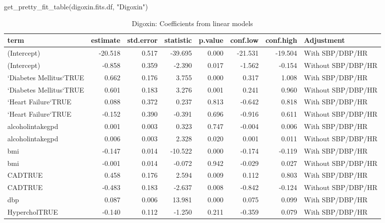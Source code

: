\documentclass[
]{article}
\newenvironment{Shaded}{\begin{snugshade}}{\end{snugshade}}
\newcommand{\FunctionTok}[1]{\textcolor[rgb]{0.00,0.00,0.00}{#1}}
\newcommand{\NormalTok}[1]{#1}
\newcommand{\StringTok}[1]{\textcolor[rgb]{0.31,0.60,0.02}{#1}}
\begin{document}
\begin{Shaded}
\begin{Highlighting}[]
\FunctionTok{get\_pretty\_fit\_table}\NormalTok{(digoxin.fits.df, }\StringTok{"Digoxin"}\NormalTok{)}
\end{Highlighting}
\end{Shaded}

\begin{table}

\caption{\label{tab:digoxin-fit-table}Digoxin: Coefficients from linear models}
\centering
\begin{tabular}[t]{l|r|r|r|r|r|r|l}
\hline
term & estimate & std.error & statistic & p.value & conf.low & conf.high & Adjustment\\
\hline
(Intercept) & -20.518 & 0.517 & -39.695 & 0.000 & -21.531 & -19.504 & With SBP/DBP/HR\\
\hline
(Intercept) & -0.858 & 0.359 & -2.390 & 0.017 & -1.562 & -0.154 & Without SBP/DBP/HR\\
\hline
`Diabetes Mellitus`TRUE & 0.662 & 0.176 & 3.755 & 0.000 & 0.317 & 1.008 & With SBP/DBP/HR\\
\hline
`Diabetes Mellitus`TRUE & 0.601 & 0.183 & 3.276 & 0.001 & 0.241 & 0.960 & Without SBP/DBP/HR\\
\hline
`Heart Failure`TRUE & 0.088 & 0.372 & 0.237 & 0.813 & -0.642 & 0.818 & With SBP/DBP/HR\\
\hline
`Heart Failure`TRUE & -0.152 & 0.390 & -0.391 & 0.696 & -0.916 & 0.611 & Without SBP/DBP/HR\\
\hline
alcoholintakegpd & 0.001 & 0.003 & 0.323 & 0.747 & -0.004 & 0.006 & With SBP/DBP/HR\\
\hline
alcoholintakegpd & 0.006 & 0.003 & 2.328 & 0.020 & 0.001 & 0.011 & Without SBP/DBP/HR\\
\hline
bmi & -0.147 & 0.014 & -10.522 & 0.000 & -0.174 & -0.119 & With SBP/DBP/HR\\
\hline
bmi & -0.001 & 0.014 & -0.072 & 0.942 & -0.029 & 0.027 & Without SBP/DBP/HR\\
\hline
CADTRUE & 0.458 & 0.176 & 2.594 & 0.009 & 0.112 & 0.803 & With SBP/DBP/HR\\
\hline
CADTRUE & -0.483 & 0.183 & -2.637 & 0.008 & -0.842 & -0.124 & Without SBP/DBP/HR\\
\hline
dbp & 0.087 & 0.006 & 13.981 & 0.000 & 0.075 & 0.099 & With SBP/DBP/HR\\
\hline
HypercholTRUE & -0.140 & 0.112 & -1.250 & 0.211 & -0.359 & 0.079 & With SBP/DBP/HR\\

\end{tabular}
\end{table}
\end{document}
